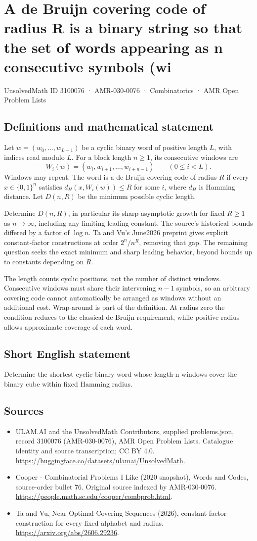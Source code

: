 \documentclass[11pt,a4paper]{article}
\begin{document}
\section*{A de Bruijn covering code of radius R is a binary string so that the set of words appearing as n consecutive symbols (wi}\label{3100076}
{\small UnsolvedMath ID 3100076 · AMR-030-0076 · Combinatorics · AMR Open Problem Lists}
\subsection{Definitions and mathematical statement}
Let $w=(w_0,\ldots,w_{L-1})$ be a cyclic binary word of positive
length $L$, with indices read modulo $L$. For a block length
$n\ge1$, its consecutive windows are
\[
           W_i(w)=(w_i,w_{i+1},\ldots,w_{i+n-1})
                              \qquad(0\le i<L).
\]
Windows may repeat. The word is a de Bruijn covering code of
radius $R$ if every $x\in\{0,1\}^n$ satisfies
$d_H(x,W_i(w))\le R$ for some $i$, where $d_H$ is Hamming
distance. Let $D(n,R)$ be the minimum possible cyclic length.

Determine $D(n,R)$, in particular its sharp asymptotic growth
for fixed $R\ge1$ as $n\to\infty$, including any limiting leading
constant. The source's historical bounds differed by a factor
of $\log n$. Ta and Vu's June2026 preprint gives explicit
constant-factor constructions at order $2^n/n^R$, removing
that gap. The remaining question seeks the exact minimum and
sharp leading behavior, beyond bounds up to constants depending
on $R$.

The length counts cyclic positions, not the number of distinct
windows. Consecutive windows must share their intervening
$n-1$ symbols, so an arbitrary covering code cannot automatically
be arranged as windows without an additional cost. Wrap-around
is part of the definition. At radius zero the condition reduces
to the classical de Bruijn requirement, while positive radius
allows approximate coverage of each word.
\subsection{Short English statement}
Determine the shortest cyclic binary word whose length-n windows cover the binary cube within fixed Hamming radius.
\subsection{Sources}
\begin{itemize}
\item[S1] ULAM.AI and the UnsolvedMath Contributors, supplied problems.json, record 3100076 (AMR-030-0076), AMR Open Problem Lists. Catalogue identity and source transcription; CC BY 4.0.
\url{https://huggingface.co/datasets/ulamai/UnsolvedMath}.
\item[S2] Cooper - Combinatorial Problems I Like (2020 snapshot), Words and Codes, source-order bullet 76. Original source indexed by AMR-030-0076.
\url{https://people.math.sc.edu/cooper/combprob.html}.
\item[S3] Ta and Vu, Near-Optimal Covering Sequences (2026), constant-factor construction for every fixed alphabet and radius.
\url{https://arxiv.org/abs/2606.29236}.
\end{itemize}
\end{document}
